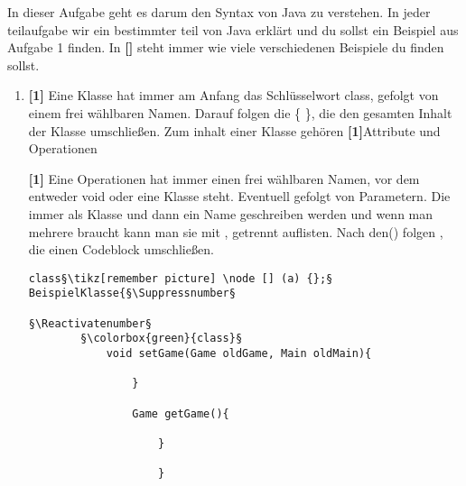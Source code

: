 
In dieser Aufgabe geht es darum den Syntax von Java zu verstehen.
In jeder teilaufgabe wir ein bestimmter teil von Java erklärt und du sollst ein Beispiel aus Aufgabe 1 finden. In \textbf{[]} steht immer wie viele verschiedenen Beispiele du finden sollst.

\begin{enumerate}
    \item \textbf{[1]} Eine Klasse hat immer am Anfang das Schlüsselwort class, gefolgt von einem frei wählbaren Namen. Darauf folgen die \{ \}, die den gesamten Inhalt der Klasse umschließen.
    Zum inhalt einer Klasse gehören \textbf{[1]}Attribute und Operationen

    \textbf{[1]} Eine Operationen hat immer einen frei wählbaren Namen, vor dem entweder void oder eine Klasse steht. Eventuell gefolgt von Parametern. Die immer als Klasse und dann ein Name geschreiben werden und wenn man mehrere braucht kann man sie mit , getrennt auflisten.
    Nach den() folgen {}, die einen Codeblock umschließen.

    \let\origthelstnumber\thelstnumber
    \makeatletter
    \newcommand*\Suppressnumber{%
      \lst@AddToHook{OnNewLine}{%
        \let\thelstnumber\relax%
         \advance\c@lstnumber-\@ne\relax%
        }%
    }
    
    \newcommand*\Reactivatenumber{%
      \lst@AddToHook{OnNewLine}{%
       \let\thelstnumber\origthelstnumber%
       \advance\c@lstnumber\@ne\relax}%
    }

    \begin{lstlisting}[title={Beispiel für eine Klasse}]
        class§\tikz[remember picture] \node [] (a) {};§ BeispielKlasse{§\Suppressnumber§
        
§\Reactivatenumber§
        §\colorbox{green}{class}§
            void setGame(Game oldGame, Main oldMain){
                
                }
                
                Game getGame(){
                    
                    }
                    
                    }
                \end{lstlisting}


\end{enumerate}
